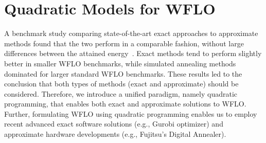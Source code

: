 \documentclass[preprint,12pt]{elsarticle}
\begin{document}
%
%
%
%
%
%


\section{Quadratic Models for WFLO}
\label{sec:QUBO4WFLO}

A benchmark study comparing state-of-the-art exact approaches \cite{Zhang2014} to 
approximate methods found that the two perform in a comparable fashion, without large differences between
the attained energy~\cite{yang2019simulated}. Exact methods tend to perform slightly better
in smaller WFLO benchmarks, while simulated annealing methods dominated for larger standard WFLO benchmarks. 
These results led to the conclusion that both types of methods (exact and approximate) should be considered. Therefore, we introduce a unified paradigm, namely quadratic programming, that enables
both exact and approximate solutions to WFLO. Further, formulating WFLO using quadratic programming enables us to employ 
recent advanced exact software solutions (e.g., Gurobi optimizer) and approximate hardware developments 
(e.g., Fujitsu's Digital Annealer).


\end{document}
